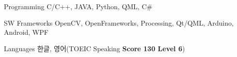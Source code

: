 


\begin{cvskills}

  \cvskill
    {Programming} %
    {C/C++, JAVA, Python, QML, C\#} %

  \cvskill
    {SW Frameworks} %
    {OpenCV, OpenFrameworks, Processing, Qt/QML, Arduino, Android, WPF} %

  \cvskill
    {Languages} %
    {한글, 영어(TOEIC Speaking \textbf{Score 130 Level 6})} %

\end{cvskills}
